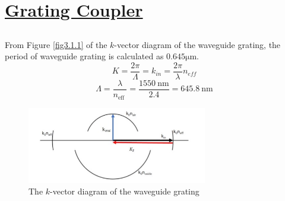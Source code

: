 \documentclass[fontsize=11pt]{scrartcl}
\begin{document}
\pagebreak
\section{\uline{Grating Coupler}}
\subsection{}
From Figure \ref{fig3.1.1} of the $k$-vector diagram of the waveguide grating, 
the period of waveguide grating is calculated as $0.645\mathrm{\mu m}$.
\begin{equation}
    K=\frac{2 \pi}{\Lambda}=k_{i n}=\frac{2 \pi}{\lambda} n_{e f f}
\end{equation}
\begin{equation}
    \Lambda=\frac{\lambda}{n_{\text {eff }}}=\frac{1550 \mathrm{~nm}}{2.4}=645.8 \mathrm{~nm}
\end{equation}  
\begin{figure}[H]
    \centering
     \includegraphics[width=0.7\textwidth]{img/fig3.1.jpg}
     \caption{The $k$-vector diagram of the waveguide grating}
     \label{fig3.1}
\end{figure}
\end{document}
